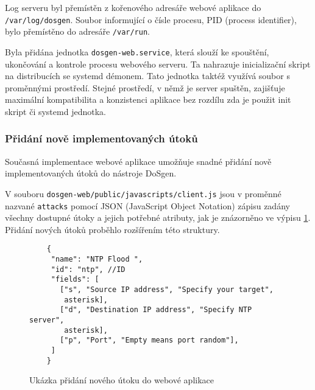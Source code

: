 Log serveru byl přemístěn z kořenového adresáře webové aplikace do \newline \texttt{/var/log/dosgen}. Soubor informující o čísle procesu, PID (process identifier), bylo přemístěno do adresáře \texttt{/var/run}.

Byla přidána jednotka \texttt{dosgen-web.service}, která slouží ke spouštění, ukončování a kontrole procesu webového serveru. Ta nahrazuje inicializační skript na distribucích se systemd démonem. Tato jednotka taktéž využívá soubor s proměnnými prostředí. Stejné prostředí, v němž je server spuštěn, zajišťuje maximální kompatibilita a konzistenci aplikace bez rozdílu zda je použit init skript či systemd jednotka.

\subsubsection{Přidání nově implementovaných útoků}
Současná implementace webové aplikace umožňuje snadné přidání nově implementovaných útoků do nástroje DoSgen.

V souboru \texttt{dosgen-web/public/javascripts/client.js} jsou v proměnné nazvané \texttt{attacks} pomocí JSON (JavaScript Object Notation) zápisu zadány všechny dostupné útoky a jejich potřebné atributy, jak je znázorněno ve výpisu \ref{fig:dosgen-web-attack-json}. Přidání nových útoků proběhlo rozšířením této struktury.


\begin{figure} [ht]
	\centering
	\begin{lstlisting}
	{
     "name": "NTP Flood ",
     "id": "ntp", //ID
     "fields": [
       ["s", "Source IP address", "Specify your target",
        asterisk],
       ["d", "Destination IP address", "Specify NTP server",
        asterisk],
       ["p", "Port", "Empty means port random"],
     ]
	}	
	\end{lstlisting}
	\caption{Ukázka přidání nového útoku do webové aplikace}
	\label{fig:dosgen-web-attack-json}
\end{figure}
